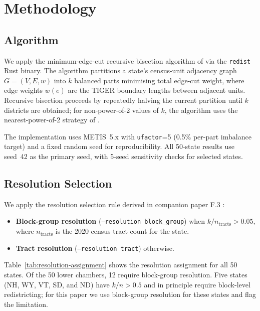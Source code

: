 \section{Methodology}
\label{sec:methodology}

\subsection{Algorithm}
\label{sec:methodology:algorithm}

We apply the minimum-edge-cut recursive bisection algorithm of
\citet{dellaLibera2026recursive} via the \texttt{redist} Rust binary.
The algorithm partitions a state's census-unit adjacency graph
$G = (V, E, w)$ into $k$ balanced parts minimising total edge-cut weight,
where edge weights $w(e)$ are the TIGER boundary lengths between adjacent units.
Recursive bisection proceeds by repeatedly halving the current partition
until $k$ districts are obtained; for non-power-of-2 values of $k$, the
algorithm uses the nearest-power-of-2 strategy of \citet{dellaLibera2026nwayRecursive}.

The implementation uses METIS~5.x \citep{karypis1998fast} with
\texttt{ufactor}=5 (0.5\% per-part imbalance target) and a fixed
random seed for reproducibility. All 50-state results use seed~42
as the primary seed, with 5-seed sensitivity checks for selected states.

\subsection{Resolution Selection}
\label{sec:methodology:resolution}

We apply the resolution selection rule derived in companion paper F.3
\citep{dellaLibera2026stateLegResolution}:
\begin{itemize}
  \item \textbf{Block-group resolution} (\texttt{--resolution block\_group})
    when $k / n_{\mathrm{tracts}} > 0.05$, where $n_{\mathrm{tracts}}$ is
    the 2020 census tract count for the state.
  \item \textbf{Tract resolution} (\texttt{--resolution tract}) otherwise.
\end{itemize}

Table~\ref{tab:resolution-assignment} shows the resolution assignment for
all 50 states. Of the 50 lower chambers, 12 require block-group resolution.
Five states (NH, WY, VT, SD, and ND) have $k/n > 0.5$ and in principle
require block-level redistricting; for this paper we use block-group
resolution for these states and flag the limitation.

